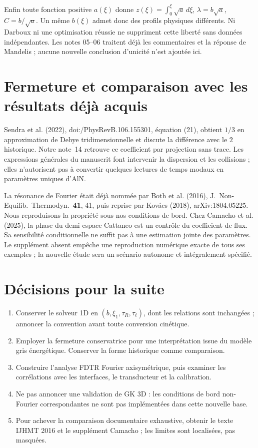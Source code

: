 \documentclass[11pt,a4paper]{article}
\begin{document}
Enfin toute fonction positive $a(\xi)$ donne
$z(\xi)=\int_0^\xi\sqrt a\,d\xi$,
$\lambda=b\sqrt a$, $C=b/\sqrt a$.
Un même $b(\xi)$ admet donc des profils physiques différents.
Ni Darboux ni une optimisation réussie ne suppriment cette liberté sans données
indépendantes. Les notes 05--06 traitent déjà les commentaires et la réponse
de Mandelis ; aucune nouvelle conclusion d'unicité n'est ajoutée ici.

\section{Fermeture et comparaison avec les résultats déjà acquis}
Sendra et al. (2022), doi:/\allowbreak PhysRevB.106.155301,
équation (21), obtient $1/3$ en approximation de Debye tridimensionnelle
et discute la différence avec le $2$ historique. Notre note~14 retrouve ce
coefficient par projection sans trace. Les expressions générales du manuscrit
font intervenir la dispersion et les collisions ; elles n'autorisent pas
à convertir quelques lectures de temps modaux en paramètres uniques d'AlN.

La résonance de Fourier était déjà nommée par Both et al. (2016),
J.\ Non-Equilib.\ Thermodyn.\ \textbf{41}, 41, puis reprise par Kovács (2018),
arXiv:1804.05225. Nous reproduisons la propriété sous nos conditions de bord.
Chez Camacho et al. (2025), la phase du demi-espace Cattaneo est un contrôle
du coefficient de flux. Sa sensibilité conditionnelle ne suffit pas à une
estimation jointe des paramètres. Le supplément absent empêche une reproduction
numérique exacte de tous ses exemples ; la nouvelle étude sera un scénario
autonome et intégralement spécifié.

\section{Décisions pour la suite}
\begin{enumerate}
\item Conserver le solveur 1D en $(b,\xi_1,\tau_R,\tau_\ell)$, dont les
relations sont inchangées ; annoncer la convention avant toute conversion cinétique.
\item Employer la fermeture conservatrice pour une interprétation issue du
modèle gris énergétique. Conserver la forme historique comme comparaison.
\item Construire l'analyse FDTR Fourier axisymétrique, puis examiner les
corrélations avec les interfaces, le transducteur et la calibration.
\item Ne pas annoncer une validation de GK 3D : les conditions de bord
non-Fourier correspondantes ne sont pas implémentées dans cette nouvelle base.
\item Pour achever la comparaison documentaire exhaustive, obtenir le texte
IJHMT 2016 et le supplément Camacho ; les limites sont localisées, pas masquées.
\end{enumerate}
\end{document}
